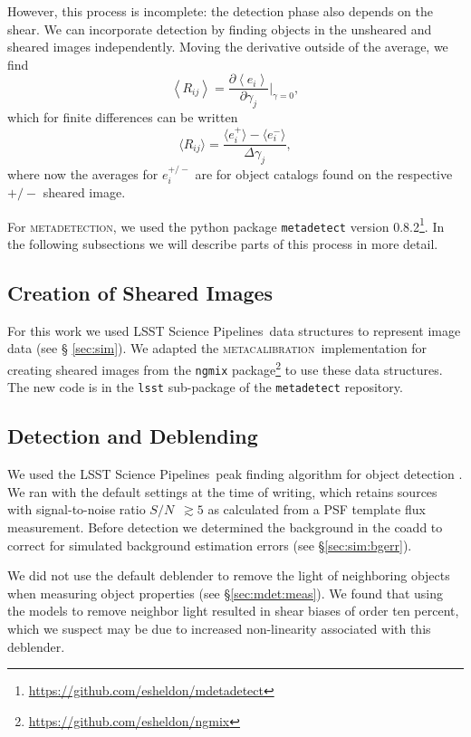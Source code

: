 \documentclass[twocolumn,twocolappendix,astrosym]{openjournal}
\newcommand{\snr}{$S/N$}
\newcommand{\dm}{LSST Science Pipelines}
\newcommand{\mcal}{\textsc{metacalibration}}
\newcommand{\mdet}{\textsc{metadetection}}
\begin{document}
However, this process is incomplete:  the detection phase also depends on the
shear.  We can incorporate detection by finding objects in the unsheared
and sheared images independently.  Moving the derivative outside of
the average, we find
\begin{equation}
    \left< R_{ij} \right> = \frac{\partial \left< e_i \right> }{\partial \gamma_j } \biggr\rvert_{\gamma=0},
\end{equation}
which for finite differences can be written
\begin{equation} \label{eq:fullR}
    \langle R_{ij}\rangle = \frac{\langle e_i^{+}\rangle - \langle e_i^{-}\rangle}{\Delta\gamma_j},
\end{equation}
where now the averages for $e_i^{+/-}$ are for object catalogs found on the
respective ${+/-}$ sheared image.

For \mdet, we used the python package \texttt{metadetect} version
0.8.2\footnote{\url{https://github.com/esheldon/mdetadetect}}.  In the
following subsections we will describe parts of this process in more detail.

\subsection{Creation of Sheared Images} \label{sec:mdet:sheared}

For this work we used \dm\ data structures to represent image data (see \S
\ref{sec:sim}).  We adapted the \mcal\ implementation for creating sheared
images from the \texttt{ngmix}
package\footnote{\url{https://github.com/esheldon/ngmix}} to use these data
structures.  The new code is in the \texttt{lsst} sub-package of
the \texttt{metadetect} repository.


\subsection{Detection and Deblending} \label{sec:mdet:detect}

We used the \dm\ peak finding algorithm for object detection
\citep{BoschHSC2017}.  We ran with the default settings at the time of writing,
which retains sources with signal-to-noise ratio \snr\ $\gtrsim 5$ as
calculated from a PSF template flux measurement.  Before detection we
determined the background in the coadd to correct for simulated background
estimation errors (see \S \ref{sec:sim:bgerr}).

We did not use the default deblender to remove the light of neighboring objects
when measuring object properties (see \S \ref{sec:mdet:meas}).  We found that
using the models to remove neighbor light resulted in shear biases of order ten
percent, which we suspect may be due to increased non-linearity associated
with this deblender.
\end{document}
